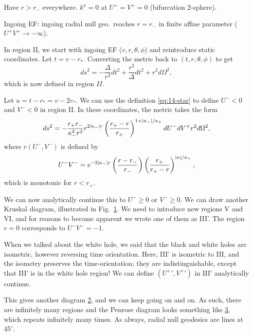 Have $r > r_-$ everywhere.
$k^a = 0$ at $U^+ = V^+ = 0$ (bifurcation 2-sphere).

Ingoing EF: ingoing radial null geo.~reaches $r = r_-$ in finite affine parameter ($U^+ V^+ \to -\infty$).

In region II, we start with ingoing EF ($v, r, \theta, \phi$) and reintroduce static coordinates.
Let $t = v - r_*$.
Converting the metric back to $(t, r, \theta, \phi)$ to get
\begin{equation}
  ds^2 =-\frac{\Delta}{r^2} dt^2 + \frac{r^2}{\Delta} dt^2 + r^2 d\Omega^2,
\end{equation}
which is now defined in region $II$.

Let $u = t - r_* = v - 2 r_*$.
We can use the definition \eqref{eq:14-star} to define $U^- < 0$ and $V^- < 0$ in region II.
In these coordinates, the metric takes the form
\begin{equation}
  ds^2 = - \frac{r_+ r_-}{\kappa_-^2 r^2} r^{2 \abs{\kappa_-} r} \left( \frac{r_+ - r}{r_+} \right)^{1 + \abs{\kappa_-}/\kappa_+} dU^- dV^ + r^2 d\Omega^2,
\end{equation}
where $r(U^-, V^-)$ is defined by
\begin{equation}
  U^- V^- = e^{-2 \abs{\kappa_-} r} \left( \frac{r - r_-}{r_-} \right) \left( \frac{r_+}{r_+ - r} \right)^{\abs{\kappa}/ \kappa_+},
\end{equation}
which is monotonic for $r < r_+$.

We can now analytically continue this to $U^- \geq 0$ or $V^- \geq 0$.
We can draw another Kruskal diagram, illustrated in Fig.~\ref{fig:l14f2}.
We need to introduce new regions V and VI, and for reasons to become apparent we wrote one of them as III'.
The region $r = 0$ corresponds to $U^- V^- = -1$.
\begin{figure}[tbhp]
  \centering
  \def\svgwidth{0.4\columnwidth}
  
  \caption{}
  \label{fig:l14f2}
\end{figure}

When we talked about the white hole, we said that the black and white holes are isometric, however reversing time orientation.
Here, III' is isometric to III, and the isometry preserves the time-orientation; they are indistinguishable, except that III' is in the white hole region!
We can define $(U^+{}', V^+{}')$ in III' analytically continue.
\begin{figure}[tbhp]
  \centering
  \def\svgwidth{0.4\columnwidth}
  
  \caption{}
  \label{fig:l14f3}
\end{figure}
This gives another diagram \ref{fig:l14f3}, and we can keep going on and on.
As such, there are infinitely many regions and the Penrose diagram looks something like \ref{fig:l14f4}, which repeats infinitely many times.
As always, radial null geodesics are lines at $45^\circ$.
\begin{figure}[tbhp]
  \centering
  \def\svgwidth{0.4\columnwidth}
  
  \caption{}
  \label{fig:l14f4}
\end{figure}

